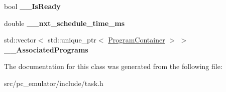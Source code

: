 \begin{DoxyCompactItemize}
\item 
bool {\bfseries \+\_\+\+\_\+\+Is\+Ready}\hypertarget{classpc__emulator_1_1Task_a1e5f3bfb642ce598ffcb2a7b52b34e83}{}\label{classpc__emulator_1_1Task_a1e5f3bfb642ce598ffcb2a7b52b34e83}

\item 
double {\bfseries \+\_\+\+\_\+nxt\+\_\+schedule\+\_\+time\+\_\+ms}\hypertarget{classpc__emulator_1_1Task_aebf00535089b78623b641fe7de77c5df}{}\label{classpc__emulator_1_1Task_aebf00535089b78623b641fe7de77c5df}

\item 
std\+::vector$<$ std\+::unique\+\_\+ptr$<$ \hyperlink{classpc__emulator_1_1ProgramContainer}{Program\+Container} $>$ $>$ {\bfseries \+\_\+\+\_\+\+Associated\+Programs}\hypertarget{classpc__emulator_1_1Task_a930efc75d9989d4f4b2d896bcf6801a5}{}\label{classpc__emulator_1_1Task_a930efc75d9989d4f4b2d896bcf6801a5}

\end{DoxyCompactItemize}


The documentation for this class was generated from the following file\+:\begin{DoxyCompactItemize}
\item 
src/pc\+\_\+emulator/include/task.\+h\end{DoxyCompactItemize}
